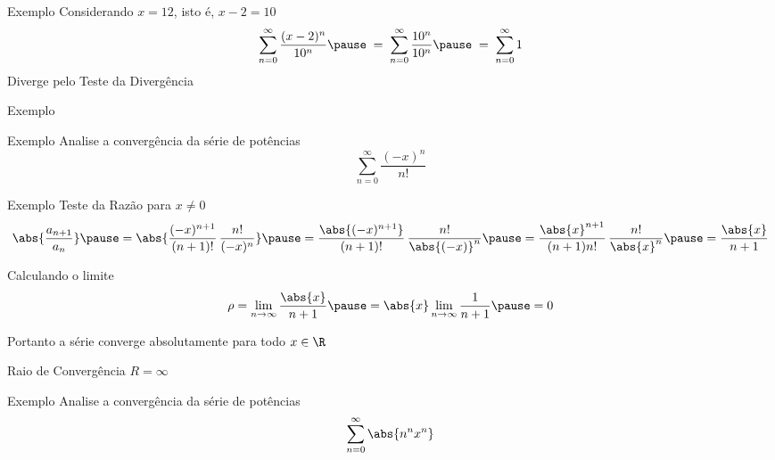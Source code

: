 \begin{frame}{Exemplo \theexemplo}
  Considerando \(x = 12\), isto é, \(x-2=10\)
  \pause
  \[
    \sum_{n=0}^\infty \frac{(x-2)^n}{10^n} \pause \;=\;
    \sum_{n=0}^\infty \frac{10^n}{10^n}    \pause \;=\;
    \sum_{n=0}^\infty 1
  \]
  \pause
  Diverge pelo Teste da Divergência
\end{frame}

\begin{frame}{Exemplo \theexemplo}
\end{frame}

\addtocounter{exemplo}{1}
\begin{frame}{Exemplo \theexemplo}
  Analise a convergência da série de potências
  \[
    \sum_{n=0}^\infty \frac{(-x)^n}{n!}
  \]
\end{frame}

\begin{frame}{Exemplo \theexemplo}
  Teste da Razão para \(x \neq 0\)
  \pause
  \[
    \abs{\frac{a_{n+1}}{a_n}}                                \pause =
    \abs{\frac{(-x)^{n+1}}{(n+1)!}\,\frac{n!}{(-x)^n}}       \pause =
    \frac{\abs{(-x)^{n+1}}}{(n+1)!}\,\frac{n!}{\abs{(-x)}^n} \pause =
    \frac{\abs{x}^{n+1}}{(n+1)n!}\,\frac{n!}{\abs{x}^n}      \pause =
    \frac{\abs{x}}{n+1}
  \]

  \pause
  Calculando o limite
  \[
    \rho
    = \lim_{n\to\infty} \frac{\abs{x}}{n+1}
    \pause
    = \abs{x} \lim_{n\to\infty} \frac{1}{n+1}
    \pause
    = 0
  \]

  \pause
  Portanto a série converge absolutamente para todo \(x\in\R\)

  \pause
  \vspace{0.5\baselineskip}
  Raio de Convergência \(R = \infty\)
\end{frame}

\addtocounter{exemplo}{1}
\begin{frame}{Exemplo \theexemplo}
  Analise a convergência da série de potências
  \[
    \sum_{n=0}^\infty \abs{n^n x^n}
  \]
\end{frame}


